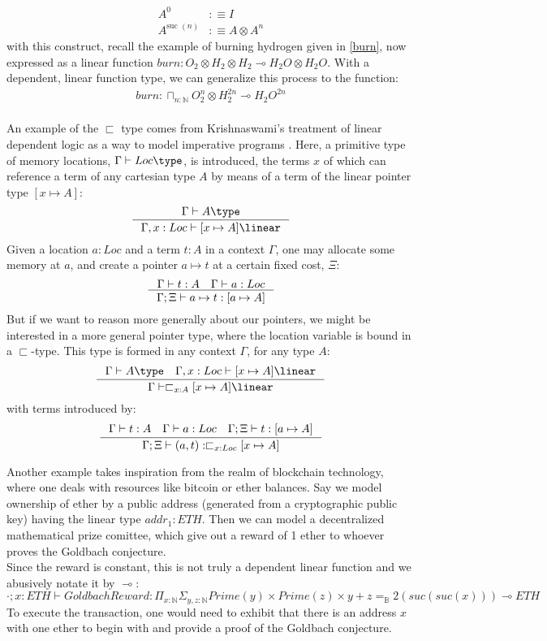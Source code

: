 \[
  \begin{split}
  A^0 &:\equiv I\\
  A^{\text{suc }(n)} &:\equiv A \otimes A^n
  \end{split}
\]
with this construct, recall the example of burning hydrogen given in \ref{burn}, now expressed as a linear function $burn : O_2 \otimes H_2 \otimes H_2 \multimap H_2O \otimes H_2O$. With a dependent, linear function type, we can generalize this process to the function:
\[
  \begin{split}
  burn : \sqcap_{n : \mathbb{N}}O_2^n \otimes H_2^{2n} \multimap H_2O^{2n}
  \end{split}
\]
\\
An example of the $\sqsubset$ type comes from Krishnaswami's treatment of linear dependent logic as a way to model imperative programs \cite{krishnaswami}. Here, a primitive type of memory locations, $\Gamma \vdash Loc \type$, is introduced, the terms $x$ of which can reference a term of any cartesian type $A$ by means of a term of the linear pointer type $[x \mapsto A]$:
\[ 
  \inference{\Gamma \vdash A \type}
  {\Gamma, x : Loc \vdash [x \mapsto A] \linear}
\]
Given a location $a : Loc$ and a term $t : A$ in a context $\Gamma$, one may allocate some memory at $a$, and create a pointer $a \mapsto t$ at a certain fixed cost, $\Xi$:
\[
  \inference{\Gamma \vdash t : A \quad \Gamma \vdash a : Loc}
  {\Gamma; \Xi \vdash a \mapsto t : [a \mapsto A]}
\]
But if we want to reason more generally about our pointers, we might be interested in a more general pointer type, where the location variable is bound in a $\sqsubset$-type. This type is formed in any context $\Gamma$, for any type $A$:
\[
  \inference{\Gamma \vdash A \type \quad \Gamma, x : Loc \vdash [x \mapsto A] \linear} 
  {\Gamma \vdash \sqsubset_{x : A}[x \mapsto A] \linear}
\]
with terms introduced by:
\[
  \inference{\Gamma \vdash t : A \quad \Gamma \vdash a : Loc \quad \Gamma; \Xi \vdash t : [a \mapsto A]}
  {\Gamma; \Xi \vdash (a, t) : \sqsubset_{x : Loc} [x \mapsto A]}
\]


Another example takes inspiration from the realm of blockchain technology, where one deals with resources like bitcoin or ether balances. Say we model ownership of ether by a public address (generated from a cryptographic public key) having the linear type $addr_1 : ETH$. Then we can model a decentralized  mathematical prize comittee, which give out a reward of 1 ether to whoever proves the Goldbach conjecture.\\
Since the reward is constant, this is not truly a dependent linear function and we abusively notate it by $\multimap$:
\[
\cdot; x : ETH \vdash GoldbachReward: \Pi_{x : \mathbb{N}}\Sigma_{y, z : \mathbb{N}}Prime(y) \times Prime(z) \times y + z =_{\mathbb{B}} 2(suc(suc(x))) \multimap ETH
\]
To execute the transaction, one would need to exhibit that there is an address $x$ with one ether to begin with and provide a proof of the Goldbach conjecture.\\
